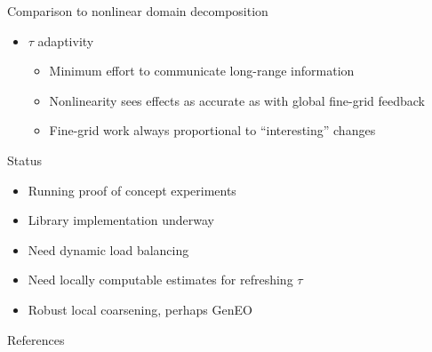 \documentclass[final,t]{beamer}
\begin{document}
\begin{frame}{}
\begin{columns}
\begin{column}{0.31\textwidth}
\begin{block}{Comparison to nonlinear domain decomposition}
\begin{itemize}
\begin{itemize}
          \item Many real nonlinearities are activated by long-range forces
            \begin{itemize}
            \item faults, friction, locking in granular media
            \end{itemize}
          \item Two-stage algorithm has different load balancing
            \begin{itemize}
            \item Nonlinear subdomain solves
            \item Global linear solve
            \end{itemize}
          \end{itemize}
        \item $\tau$ adaptivity
          \begin{itemize}
          \item Minimum effort to communicate long-range information
          \item Nonlinearity sees effects as accurate as with global fine-grid feedback
          \item Fine-grid work always proportional to ``interesting'' changes
          \end{itemize}
        \end{itemize}
      \end{block}
      \vspace{-2em}
      \begin{block}{Status}
        \begin{itemize}
        \item Running proof of concept experiments
        \item Library implementation underway
        \item Need dynamic load balancing
        \item Need locally computable estimates for refreshing $\tau$
        \item Robust local coarsening, perhaps GenEO~\cite{spillane2011abstract,jolivet2013scalabledd}
        \end{itemize}
      \end{block}
      \vspace{-2em}
      \begin{block}{References}
        \scriptsize
        \nocite{adams2014segmental,brandt1984,brandt1994multigrid}
        \begin{minipage}{\textwidth}
          \begin{multicols}{2}
            
          \end{multicols}
        \end{minipage}
      \end{block}
    \end{column}
  \end{columns}
\end{frame}
\end{document}
